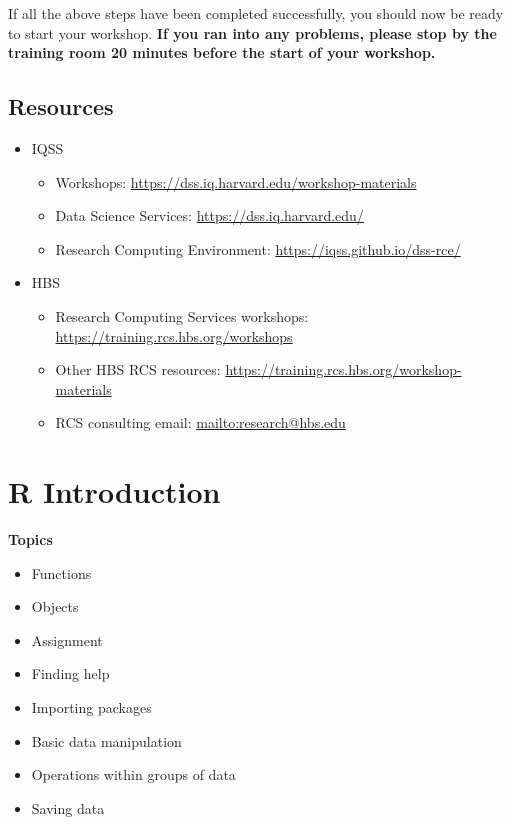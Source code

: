 \documentclass[
]{book}
\providecommand{\tightlist}{%
  \setlength{\itemsep}{0pt}\setlength{\parskip}{0pt}}
\begin{document}
If all the above steps have been completed successfully, you should now
be ready to start your workshop. \textbf{If you ran into any problems, please
stop by the training room 20 minutes before the start of your workshop.}

\hypertarget{resources-1}{%
\section{Resources}\label{resources-1}}

\begin{itemize}
\tightlist
\item
  IQSS

  \begin{itemize}
  \tightlist
  \item
    Workshops: \url{https://dss.iq.harvard.edu/workshop-materials}
  \item
    Data Science Services: \url{https://dss.iq.harvard.edu/}
  \item
    Research Computing Environment: \url{https://iqss.github.io/dss-rce/}
  \end{itemize}
\item
  HBS

  \begin{itemize}
  \tightlist
  \item
    Research Computing Services workshops: \url{https://training.rcs.hbs.org/workshops}
  \item
    Other HBS RCS resources: \url{https://training.rcs.hbs.org/workshop-materials}
  \item
    RCS consulting email: \url{mailto:research@hbs.edu}
  \end{itemize}
\end{itemize}

\hypertarget{r-introduction}{%
\chapter{R Introduction}\label{r-introduction}}

\textbf{Topics}

\begin{itemize}
\tightlist
\item
  Functions
\item
  Objects
\item
  Assignment
\item
  Finding help
\item
  Importing packages
\item
  Basic data manipulation
\item
  Operations within groups of data
\item
  Saving data
\end{itemize}
\end{document}
